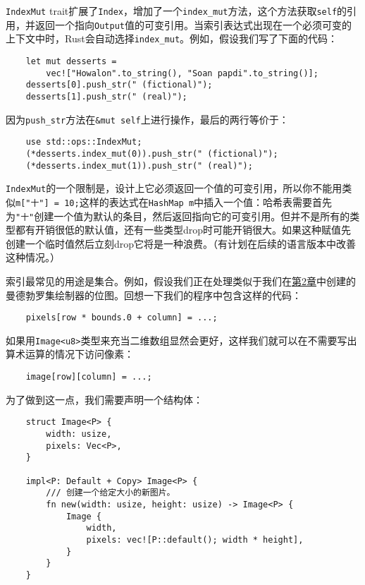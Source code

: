 \texttt{IndexMut} trait扩展了\texttt{Index}，增加了一个\texttt{index\_mut}方法，这个方法获取\texttt{self}的引用，并返回一个指向\texttt{Output}值的可变引用。当索引表达式出现在一个必须可变的上下文中时，Rust会自动选择\texttt{index\_mut}。例如，假设我们写了下面的代码：
\begin{verbatim}
    let mut desserts =
        vec!["Howalon".to_string(), "Soan papdi".to_string()];
    desserts[0].push_str(" (fictional)");
    desserts[1].push_str(" (real)");
\end{verbatim}

因为\texttt{push\_str}方法在\texttt{\&mut self}上进行操作，最后的两行等价于：
\begin{verbatim}
    use std::ops::IndexMut;
    (*desserts.index_mut(0)).push_str(" (fictional)");
    (*desserts.index_mut(1)).push_str(" (real)");
\end{verbatim}

\texttt{IndexMut}的一个限制是，设计上它必须返回一个值的可变引用，所以你不能用类似\texttt{m["十"] = 10;}这样的表达式在\texttt{HashMap m}中插入一个值：哈希表需要首先为\texttt{"十"}创建一个值为默认的条目，然后返回指向它的可变引用。但并不是所有的类型都有开销很低的默认值，还有一些类型drop时可能开销很大。如果这种赋值先创建一个临时值然后立刻drop它将是一种浪费。（有计划在后续的语言版本中改善这种情况。）

索引最常见的用途是集合。例如，假设我们正在处理类似于我们在\hyperref[ch02]{第2章}中创建的曼德勃罗集绘制器的位图。回想一下我们的程序中包含这样的代码：
\begin{verbatim}
    pixels[row * bounds.0 + column] = ...;
\end{verbatim}

如果用\texttt{Image<u8>}类型来充当二维数组显然会更好，这样我们就可以在不需要写出算术运算的情况下访问像素：
\begin{verbatim}
    image[row][column] = ...;
\end{verbatim}

为了做到这一点，我们需要声明一个结构体：
\begin{verbatim}
    struct Image<P> {
        width: usize,
        pixels: Vec<P>,
    }

    impl<P: Default + Copy> Image<P> {
        /// 创建一个给定大小的新图片。
        fn new(width: usize, height: usize) -> Image<P> {
            Image {
                width,
                pixels: vec![P::default(); width * height],
            }
        }
    }
\end{verbatim}

